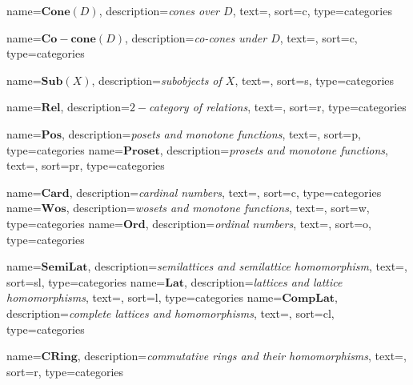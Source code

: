   {name=$\mathbf{Cone}(D)$, description=\emph{cones over $D$},
  text={}, sort=c, type=categories}
  \DeclareMathOperator{\Cone}{\gls{Cone}}%

  {name=$\mathbf{Co-cone}(D)$, description=\emph{co-cones under $D$},
  text={}, sort=c, type=categories}
  \DeclareMathOperator{\Cocone}{\gls{Co-cone}}%

  {name=$\mathbf{Sub}(X)$, description=\emph{subobjects of $X$},
  text={}, sort=s, type=categories}
  \DeclareMathOperator{\Sub}{Sub}%


  {name=$\mathbf{Rel}$, description=\emph{$2-$category of relations},
  text={}, sort=r, type=categories}
  \DeclareMathOperator{\Rel}{\gls{Rel}}%

  {name=$\mathbf{Pos}$, description=\emph{posets and monotone functions},
  text={}, sort=p, type=categories}
  \DeclareMathOperator{\Pos}{\gls{Pos}}%
  {name=$\mathbf{Proset}$, description=\emph{prosets and monotone functions},
  text={}, sort=pr, type=categories}
  \DeclareMathOperator{\Proset}{\gls{Proset}}%

  {name=$\mathbf{Card}$, description=\emph{cardinal numbers},
  text={}, sort=c, type=categories}
  \DeclareMathOperator{\Card}{\gls{Card}}%
  {name=$\mathbf{Wos}$, description=\emph{wosets and monotone functions},
  text={}, sort=w, type=categories}
  \DeclareMathOperator{\Wos}{\gls{Wos}}%
  {name=$\mathbf{Ord}$, description=\emph{ordinal numbers},
  text={}, sort=o, type=categories}
  \DeclareMathOperator{\Ord}{\gls{Ord}}%

  {name=$\mathbf{SemiLat}$, description=\emph{semilattices and semilattice homomorphism},
  text={}, sort=sl, type=categories}
  \DeclareMathOperator{\SemiLat}{\gls{SemiLat}}%
  {name=$\mathbf{Lat}$, description=\emph{lattices and lattice homomorphisms},
  text={}, sort=l, type=categories}
  \DeclareMathOperator{\Lat}{\gls{Lat}}%
  {name=$\mathbf{CompLat}$, description=\emph{complete lattices and homomorphisms},
  text={}, sort=cl, type=categories}
  \DeclareMathOperator{\CompLat}{\gls{CompLat}}%

{name=$\mathbf{CRing}$, description=\emph{commutative rings and their homomorphisms},
	text={}, sort=r, type=categories}
\DeclareMathOperator{\CRing}{\gls{CRing}}%
